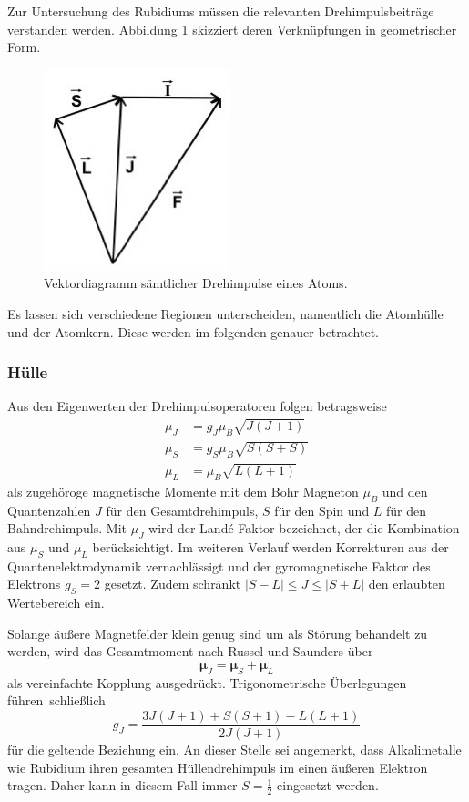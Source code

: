 Zur Untersuchung des Rubidiums müssen die relevanten Drehimpulsbeiträge verstanden werden. Abbildung \ref{fig:drehimpulse}
skizziert deren Verknüpfungen in geometrischer Form.

\begin{figure}[H]
	\centering
	\includegraphics[width=0.25\linewidth]{content/grafik/drehimpulse.jpg}
	\caption{Vektordiagramm sämtlicher Drehimpulse eines Atoms. \cite{pumpen}}
	\label{fig:drehimpulse}
\end{figure}

Es lassen sich verschiedene Regionen unterscheiden, namentlich die Atomhülle und der Atomkern. Diese werden im folgenden 
genauer betrachtet.

\subsubsection{Hülle}

Aus den Eigenwerten der Drehimpulsoperatoren folgen betragsweise
\begin{align*}
	\mu_J &= g_J \mu_B \sqrt{J(J + 1)} \\
	\mu_S &= g_S \mu_B \sqrt{S(S + S)} \\
	\mu_L &= \mu_B \sqrt{L(L + 1)}
\end{align*}
als zugehöroge magnetische Momente mit dem Bohr Magneton $\mu_B$ und den Quantenzahlen $J$ für den Gesamtdrehimpuls,
$S$ für den Spin und $L$ für den Bahndrehimpuls. Mit $\mu_J$ wird der Landé Faktor bezeichnet, der die Kombination aus
$\mu_S$ und $\mu_L$ berücksichtigt. Im weiteren Verlauf werden Korrekturen aus der Quantenelektrodynamik vernachlässigt
und der gyromagnetische Faktor des Elektrons $g_S = 2$ gesetzt. Zudem schränkt $|S - L| \leq J \leq |S + L|$ den erlaubten
Wertebereich ein.

Solange äußere Magnetfelder klein genug sind um als Störung behandelt zu werden, wird das Gesamtmoment nach Russel und Saunders über
\begin{equation*}
	\bm{\mu}_J = \bm{\mu}_S + \bm{\mu}_L
\end{equation*}
als vereinfachte Kopplung ausgedrückt. Trigonometrische Überlegungen \mbox{führen schließlich}
\begin{equation}
	g_J = \frac{3 J (J + 1) + S(S + 1) - L(L + 1)}{2 J (J + 1)}
	\label{eqn:lande_J}
\end{equation}
für die geltende Beziehung ein. An dieser Stelle sei angemerkt, dass Alkalimetalle wie Rubidium ihren gesamten Hüllendrehimpuls
im einen äußeren Elektron \cite{rubidium} tragen. Daher kann in diesem Fall immer $S = \frac{1}{2}$ eingesetzt werden.


